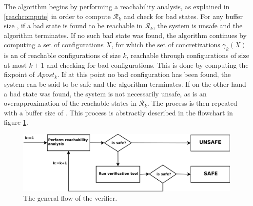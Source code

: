 The algorithm begins by performing a reachability analysis, as explained in \ref{reachcompute} in order to compute $\mathcal{R}_k$ and check for bad states. For any buffer size , if a bad state is found to be reachable in $\mathcal{R}_k$, the system is unsafe and the algorithm terminates. If no such bad state was found, the algorithm continues by computing a set of configurations $X$, for which the set of concretizations $\gamma_k(X)$ is an  of reachable configurations of size $k$, reachable through configurations of size at most $k+1$ and checking for bad configurations. This is done by computing the fixpoint of $Apost_k$. If at this point no bad configuration has been found, the system can be said to be safe and the algorithm terminates. If on the other hand a bad state was found, the system is not necessarily unsafe, as  is an overapproximation of the reachable states in $\mathcal{R}_k$. The process is then repeated with a buffer size of . This process is abstractly described in the flowchart in figure \ref{flow}.

\begin{figure}
\includegraphics[width=400pt] {bilder/flowchart.png}
\caption{The general flow of the verifier.}
\label{flow}
\end{figure}
